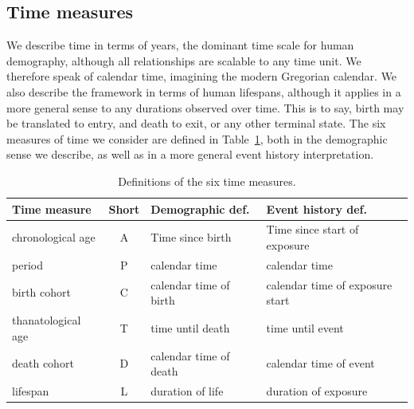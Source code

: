 \documentclass[12pt,oneside,a4paper]{article} %
\begin{document}

\FloatBarrier
\subsection{Time measures}
\FloatBarrier
We describe time in terms of years, the dominant time scale for human
demography, although all relationships are scalable to any time unit. We therefore speak of calendar time,
imagining the modern Gregorian calendar. We also describe the framework in terms
of human lifespans, although it applies in a more general sense to any durations
observed over time. This is to say, birth may be translated to entry, and death
to exit, or any other terminal state. The six measures of time we consider are
defined in Table~\ref{tab:sixdefs}, both in the demographic sense we describe, as well as in a more general event history interpretation.

\FloatBarrier
\begin{table}[ht!]
\centering
\caption{Definitions of the six time measures.}
\label{tab:sixdefs}
\begin{adjustwidth}{0em}{0em}
\begin{tabular}{lcll}
\hline 
\textbf{Time measure} & \textbf{Short} & \textbf{Demographic def.} &
\textbf{Event history def.}\\
\hline 
chronological age & A & Time since birth & Time since start of exposure \\
period & P & calendar time & calendar time \\
birth cohort & C & calendar time of birth & calendar time of exposure start \\
thanatological age & T & time until death & time until event \\
death cohort & D & calendar time of death & calendar time of event \\
lifespan & L & duration of life & duration of exposure \\
\end{tabular}
\end{adjustwidth}
\end{table}
\end{document}
